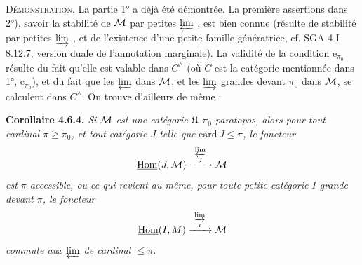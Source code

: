
\textsc{Démonstration}. La partie 1° a déjà été démontrée. La première assertions dans 2°), savoir la stabilité de $\mathcal{M}$ par petites $\varprojlim$ , est bien connue (résulte de stabilité par petites $\varinjlim$ , et de l'existence d'une petite famille génératrice, cf. SGA 4 I 8.12.7, version duale de l'annotation marginale). La validité de la condition $\mathrm{e}_{\pi_0}$ résulte du fait qu'elle est valable dans $C^{\wedge}$ (où $C$ est la catégorie mentionnée dans 1°, $\mathrm{c}_{\pi_0}$), et du fait que les $\varprojlim$ dans $\mathcal{M}$, et les $\varinjlim$ grandes devant $\pi_0$ dans $\mathcal{M}$, se calculent dans $C^{\wedge}$. On trouve d'ailleurs de même : %

\textbf{Corollaire 4.6.4.} \textit{Si $\mathcal{M}$ est une catégorie $\mathfrak{U}$-$\pi_0$-paratopos, alors pour tout cardinal $\pi \geqslant \pi_0$, et tout catégorie $J$ telle que} $\mathrm{card}\, J \leqslant \pi$\textit{, le foncteur} %
\[
\underline{\mathrm{Hom}}(J,\mathcal{M}) \xrightarrow{\ \varprojlim\limits_{J}\ } \mathcal{M}
\]
\textit{est $\pi$-accessible, ou ce qui revient au même, pour toute petite catégorie $I$ grande devant $\pi$, le foncteur}
\[
\underline{\mathrm{Hom}}(I,M) \xrightarrow{\ \varinjlim\limits_{I}\ } \Mc %
\]
\textit{commute aux $\varprojlim$ de cardinal $\leqslant \pi$.}



